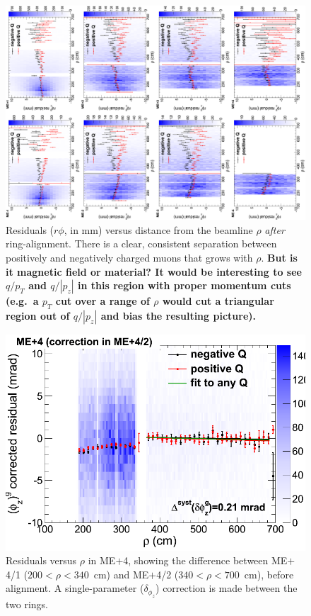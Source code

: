 \documentclass[12pt]{article}
\begin{document}
\begin{figure}
\begin{center}
\includegraphics[height=0.85\linewidth, angle=-90]{rphi_plots_vs_rho.png}
\end{center}

\caption{Residuals ($r\phi$, in mm) versus distance from the beamline
  $\rho$ {\it after} ring-alignment.  There is a clear, consistent
  separation between positively and negatively charged muons that
  grows with $\rho$.  {\bf But is it magnetic field or material?  It
    would be interesting to see $q/p_T$ and $q/|p_z|$ in this region
    with proper momentum cuts (e.g.\ a $p_T$ cut over a range of $\rho$
    would cut a triangular region out of $q/|p_z|$ and bias the
    resulting picture).} \label{fig:rphi_plots_vs_rho}}
\end{figure}

\begin{figure}
\begin{center}
\includegraphics[height=6 cm]{mapplot_me42.png}  %
\end{center}

\caption{Residuals versus $\rho$ in ME$+$4, showing the difference
  between ME$+$4/1 ($200 < \rho < 340$~cm) and ME$+$4/2 ($340 < \rho <
  700$~cm), before alignment.  A single-parameter ($\delta_{\phi_z}$)
  correction is made between the two rings. \label{fig:mapplot_me42}}
\end{figure}
\end{document}
